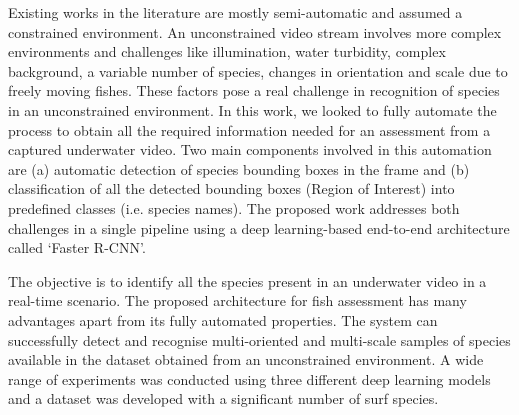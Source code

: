 \documentclass[conference]{IEEEtran}       %
\begin{document}
Existing works in the literature are mostly semi-automatic \cite{Wilson2015, Spampinato2016} and assumed a constrained environment. An unconstrained video stream involves more complex environments and challenges like illumination, water turbidity, complex background, a variable number of species, changes in orientation and scale due to freely moving fishes. These factors pose a real challenge in recognition of species in an unconstrained environment. In this work, we looked to fully automate the process to obtain all the required information needed for an assessment from a captured underwater video. Two main components involved in this automation are (a) automatic detection of species bounding boxes in the frame and (b) classification of all the detected bounding boxes (Region of Interest) into predefined classes (i.e. species names). The proposed work addresses both challenges in a single pipeline using a deep learning-based end-to-end architecture called `Faster R-CNN'. 

The objective is to identify all the species present in an underwater video in a real-time scenario. The proposed architecture for fish assessment has many advantages apart from its fully automated properties. The system can successfully detect and recognise multi-oriented and multi-scale samples of species available in the dataset obtained from an unconstrained environment. A wide range of experiments was conducted using three different deep learning models and a dataset was developed with a significant number of surf species. 
\end{document}
